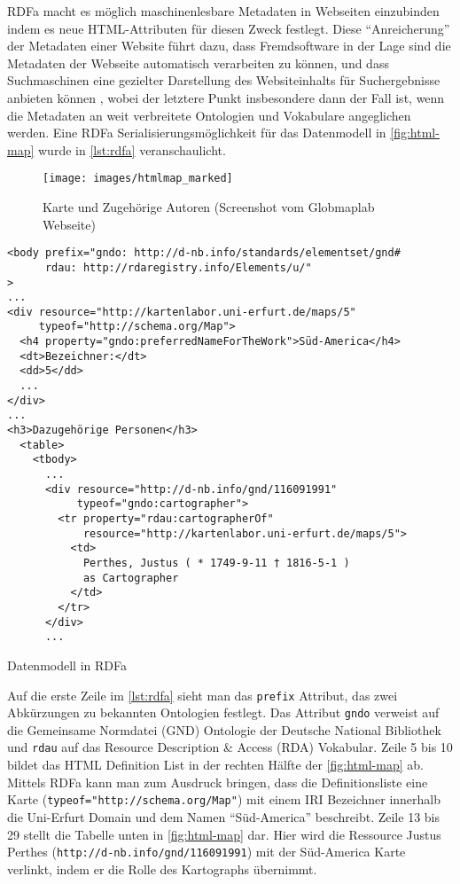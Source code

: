 RDFa macht es möglich maschinenlesbare Metadaten in Webseiten einzubinden indem es neue HTML-Attributen für diesen Zweck festlegt. Diese \hyphenquote{german}{Anreicherung} der Metadaten einer Website führt dazu, dass Fremdsoftware in der Lage sind die Metadaten der Webseite automatisch verarbeiten zu können, und dass Suchmaschinen eine gezielter Darstellung des Websiteinhalts für Suchergebnisse anbieten können \parencite[vgl.][Abs.~2]{Schreiber:14:RP}, wobei der letztere Punkt insbesondere dann der Fall ist, wenn die Metadaten an weit verbreitete Ontologien und Vokabulare angeglichen werden. Eine RDFa Serialisierungsmöglichkeit für das Datenmodell in \autoref{fig:html-map} wurde in \autoref{lst:rdfa} veranschaulicht.

\begin{figure}[h]
	\centering
	\texttt{[image: images/htmlmap\_marked]}
	\caption[Karte und Zugehörige Autoren]{Karte und Zugehörige Autoren (Screenshot vom Globmaplab Webseite)}
	\label{fig:html-map}
\end{figure}

\begin{listing}[H]
\begin{verbatim}
<body prefix="gndo: http://d-nb.info/standards/elementset/gnd#
      rdau: http://rdaregistry.info/Elements/u/"
>
...
<div resource="http://kartenlabor.uni-erfurt.de/maps/5"
     typeof="http://schema.org/Map">
  <h4 property="gndo:preferredNameForTheWork">Süd-America</h4>	
  <dt>Bezeichner:</dt>
  <dd>5</dd>
  ...
</div>
...
<h3>Dazugehörige Personen</h3>
  <table>
    <tbody>
      ...
      <div resource="http://d-nb.info/gnd/116091991"
           typeof="gndo:cartographer">
        <tr property="rdau:cartographerOf" 
            resource="http://kartenlabor.uni-erfurt.de/maps/5">
          <td>
            Perthes, Justus ( * 1749-9-11 † 1816-5-1 ) 
            as Cartographer
          </td>
        </tr>
      </div>
      ...
\end{verbatim}
\caption{Datenmodell in RDFa}
\label{lst:rdfa}
\end{listing}

Auf die erste Zeile im \autoref{lst:rdfa} sieht man das \texttt{prefix} Attribut, das zwei Abkürzungen zu bekannten Ontologien festlegt. Das Attribut \texttt{gndo} verweist auf die Gemeinsame Normdatei (GND) Ontologie der Deutsche National Bibliothek und \texttt{rdau} auf das Resource Description \& Access (RDA) Vokabular.  Zeile 5 bis 10 bildet das HTML Definition List in der rechten Hälfte der \autoref{fig:html-map} ab. Mittels RDFa kann man zum Ausdruck bringen, dass die Definitionsliste eine Karte (\texttt{typeof="http://schema.org/Map"}) mit einem IRI Bezeichner innerhalb die Uni-Erfurt Domain und dem Namen \hyphenquote{german}{Süd-America} beschreibt. Zeile 13 bis 29 stellt die Tabelle unten in \autoref{fig:html-map} dar. Hier wird die Ressource Justus Perthes (\texttt{http://d-nb.info/gnd/116091991}) mit der Süd-America Karte verlinkt, indem er die Rolle des Kartographs übernimmt. 
